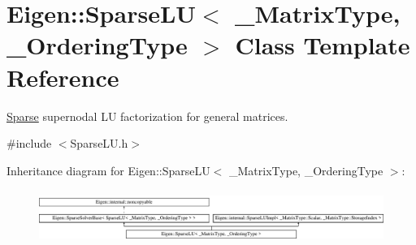\hypertarget{class_eigen_1_1_sparse_l_u}{}\section{Eigen\+::Sparse\+LU$<$ \+\_\+\+Matrix\+Type, \+\_\+\+Ordering\+Type $>$ Class Template Reference}
\label{class_eigen_1_1_sparse_l_u}


\mbox{\hyperlink{struct_eigen_1_1_sparse}{Sparse}} supernodal LU factorization for general matrices.  




{\ttfamily \#include $<$Sparse\+L\+U.\+h$>$}

Inheritance diagram for Eigen\+::Sparse\+LU$<$ \+\_\+\+Matrix\+Type, \+\_\+\+Ordering\+Type $>$\+:\begin{figure}[H]
\begin{center}
\leavevmode
\includegraphics[height=1.753654cm]{class_eigen_1_1_sparse_l_u}
\end{center}
\end{figure}
